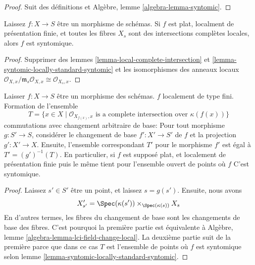 \begin{proof}
Suit des définitions et Algèbre, lemme \ref{algebra-lemma-syntomic}.
\end{proof}

\begin{lemma}

\label{lemma-syntomic-flat-fibres}
Laissez $f : X \to S$ être un morphisme de schémas. Si $f$ est plat, localment de présentation finie, et toutes les fibres $X_s$ sont des intersections complètes locales, alors $f$ est syntomique.
\end{lemma}

\begin{proof}
Supprimer des lemmes \ref{lemma-local-complete-intersection} et \ref{lemma-syntomic-locally-standard-syntomic} et les isomorphismes des anneaux locaux $
\mathcal{O}_{X, x}/\mathfrak m_s \mathcal{O}_{X, x}
\cong
\mathcal{O}_{X_s, x}
$.
\end{proof}

\begin{lemma}

\label{lemma-set-points-where-fibres-lci}

Laisser $f : X \to S$ être un morphisme des schémas. $f$ localement de type fini. Formation de l'ensemble
$$
T = \{x \in X \mid \mathcal{O}_{X_{f(x)}, x}
\text{ is a complete intersection over }\kappa(f(x))\}
$$
commutations avec changement arbitraire de base: Pour tout morphisme $g : S' \to S$, considérer le changement de base $f' : X' \to S'$ de $f$ et la projection $g' : X' \to X$. Ensuite, l'ensemble correspondant $T'$ pour le morphisme $f'$ est égal à $T' = (g')^{-1}(T)$. En particulier, si $f$ est supposé plat, et localement de présentation finie puis le même tient pour l'ensemble ouvert de points où $f$ C'est syntomique.

\end{lemma}

\begin{proof}
Laissez $s' \in S'$ être un point, et laissez $s = g(s')$. Ensuite, nous avons $$
X'_{s'} =
\Spec(\kappa(s')) \times_{\Spec(\kappa(s))} X_s
$$ En d'autres termes, les fibres du changement de base sont les changements de base des fibres. C'est pourquoi la première partie est équivalente à Algèbre, lemme \ref{algebra-lemma-lci-field-change-local}. La deuxième partie suit de la première parce que dans ce cas $T$ est l'ensemble de points où $f$ est syntomique selon lemme \ref{lemma-syntomic-locally-standard-syntomic}.
\end{proof}

